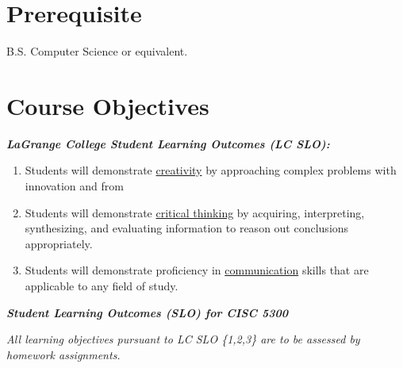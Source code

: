 \documentclass[11pt]{article}
\begin{document}

\section*{Prerequisite}
B.S. Computer Science or equivalent.


\section*{Course Objectives}
\textbf{\textit{LaGrange College Student Learning Outcomes (LC SLO):}}

\begin{enumerate}
\item Students will demonstrate \underline{creativity} by approaching complex problems with innovation and from
\item Students will demonstrate \underline{critical thinking} by acquiring, interpreting, synthesizing, and evaluating
information to reason out conclusions appropriately.
\item Students will demonstrate proficiency in \underline{communication} skills that are applicable to any field of
study.
\end{enumerate}

\textbf{\textit{Student Learning Outcomes (SLO) for CISC 5300}}

\textit{All learning objectives pursuant to LC SLO \{1,2,3\} are to be assessed by homework assignments.}
\end{document}

